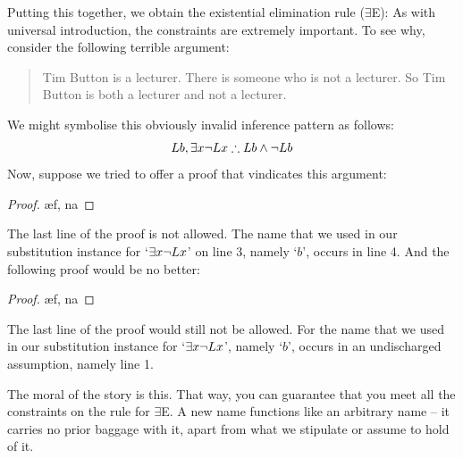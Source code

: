 Putting this together, we obtain the existential elimination rule ($\exists$E):
As with universal introduction, the constraints are extremely important. To see why, consider the following terrible argument:
	\begin{quote}
		Tim Button is a lecturer. There is someone who is not a lecturer. So Tim Button is both a lecturer and not a lecturer.
	\end{quote}
We might symbolise this obviously invalid inference pattern as follows:
$$Lb, \exists x \neg Lx \mathrel{\therefore} Lb \wedge \neg Lb$$
Now, suppose we tried to offer a proof that vindicates this argument:
\begin{proof}
	\open	
		\ae{f, na}
	\close
\end{proof}
The last line of the proof is not allowed. The name that we used in our substitution instance for `$\exists x \neg Lx$' on line 3, namely `$b$', occurs in line 4. And the following proof would be no better:
\begin{proof}
	\open	
		\ae{f, na}
	\close
\end{proof}
The last line of the proof would still not be allowed. For the name that we used in our substitution instance for `$\exists x \neg Lx$', namely `$b$', occurs in an undischarged assumption, namely line 1. 

The moral of the story is this.  That way, you can guarantee that you meet all the constraints on the rule for $\exists$E. A new name functions like an arbitrary name – it carries no prior baggage with it, apart from what we stipulate or assume to hold of it. 

